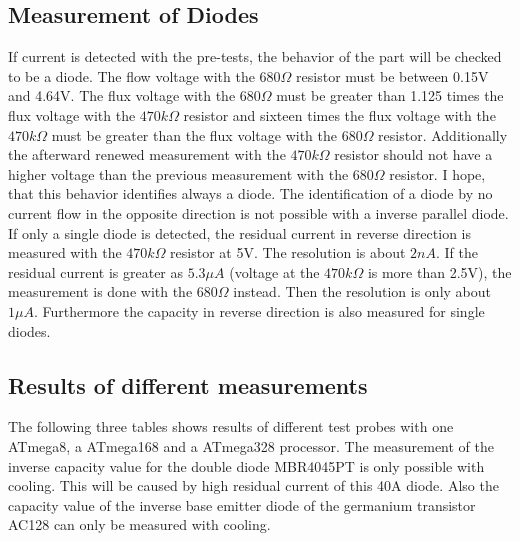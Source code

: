 \subsection{Measurement of Diodes}
\label{sec:diode}
If current is detected with the pre-tests, the behavior of the part will be checked to be a diode.
The flow voltage with the \(680\Omega\) resistor must be between 0.15V and 4.64V.
The flux voltage with the \(680\Omega\) must be greater than 1.125 times the flux voltage with
the \(470k\Omega\) resistor and sixteen times the flux voltage with the \(470k\Omega\) must be
greater than the flux voltage with the \(680\Omega\) resistor.
Additionally the afterward renewed measurement with the \(470k\Omega\) resistor should not have a higher voltage than
the previous measurement with the \(680\Omega\) resistor.
I hope, that this behavior identifies always a diode.
The identification of a diode by no current flow in the opposite direction is not
possible with a inverse parallel diode.
If only a single diode is detected, the residual current in reverse direction is measured with
the \(470k\Omega\) resistor at 5V. The resolution is about \(2nA\).
If the residual current is greater as \(5.3\mu A\) (voltage at
the \(470k\Omega\) is more than 2.5V), the measurement is done with the \(680\Omega\) instead.
Then the resolution is only about \(1\mu A\).
Furthermore  the capacity in reverse direction is also measured for single diodes.

\subsection{Results of different measurements}
The following three tables shows results of different test probes 
with one ATmega8, a ATmega168 and a ATmega328 processor.
The measurement of the inverse capacity value for the double diode MBR4045PT is 
only possible with cooling. This will be caused by high residual current of this 40A diode.
Also the capacity value of the inverse base emitter diode of the germanium transistor AC128 can
only be measured with cooling.

